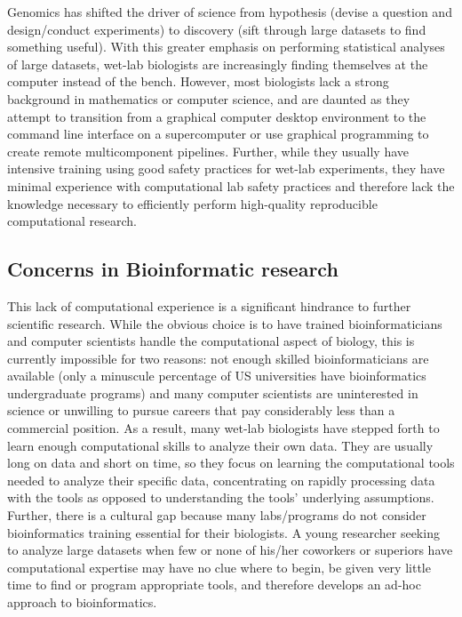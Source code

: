 \documentclass[ChapterTOCs,krantz2]{krantz} %
\begin{document}
Genomics has shifted the driver of science from hypothesis (devise a question 
and design/conduct experiments) to discovery (sift through large datasets 
to find something useful).  With this greater emphasis on performing 
statistical analyses of large datasets, wet-lab biologists are
increasingly finding themselves at the computer instead of the bench.  
However, most biologists lack a strong background in mathematics or
computer science, and are daunted as they attempt to transition from a graphical
computer desktop environment to the command line interface on a 
supercomputer or use graphical programming to create remote 
multicomponent pipelines.  Further, while they
usually have intensive training using good safety practices 
for wet-lab experiments, they have minimal experience with computational 
lab safety practices and therefore lack the knowledge necessary to 
efficiently perform high-quality reproducible 
computational research.

\subsection{Concerns in Bioinformatic research}

This lack of computational experience is a significant hindrance to further
scientific research.  While the obvious choice is
to have trained bioinformaticians and computer scientists handle the
computational aspect of biology, this is currently impossible for two reasons:
not enough skilled bioinformaticians are available (only a minuscule percentage
of US universities have bioinformatics undergraduate programs) and many
computer scientists are uninterested in science or unwilling to pursue careers
that pay considerably less than a commercial position.  As a result, many
wet-lab biologists have stepped forth to learn enough 
computational skills to analyze their own data.  
They are usually long on data and short on time, so they
focus on learning the computational tools needed to analyze their specific
data, concentrating on rapidly processing data with the tools 
as opposed to understanding the tools' underlying
assumptions.  Further, there is a cultural gap
because many labs/programs do not consider bioinformatics training 
essential for their biologists.  A young researcher seeking to analyze large datasets 
when few or none of his/her coworkers or superiors have
computational expertise may have no clue where to begin, be given very little
time to find or program appropriate tools, and therefore develops an ad-hoc
approach to bioinformatics.    
\end{document}
